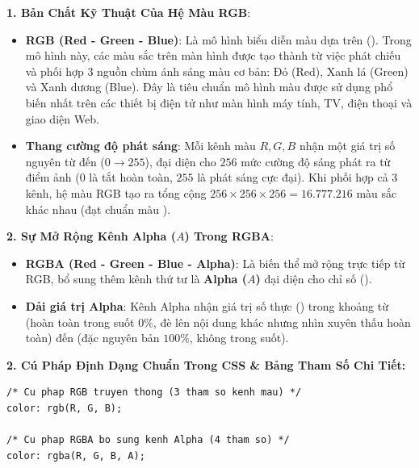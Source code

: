 \begin{conceptBox}
\textbf{1. Bản Chất Kỹ Thuật Của Hệ Màu RGB}:
\begin{itemize}[leftmargin=1.5em, itemsep=3pt, parsep=0pt]
    \item \textbf{RGB (Red - Green - Blue)}: Là mô hình biểu diễn màu dựa trên  (). Trong mô hình này, các màu sắc trên màn hình được tạo thành từ việc phát chiếu và phối hợp 3 nguồn chùm ánh sáng màu cơ bản: Đỏ (Red), Xanh lá (Green) và Xanh dương (Blue). Đây là tiêu chuẩn mô hình màu được sử dụng phổ biến nhất trên các thiết bị điện tử như màn hình máy tính, TV, điện thoại và giao diện Web.
    \item \textbf{Thang cường độ phát sáng}: Mỗi kênh màu $R, G, B$ nhận một giá trị số nguyên từ  đến  ($0 \rightarrow 255$), đại diện cho $256$ mức cường độ sáng phát ra từ điểm ảnh ($0$ là tắt hoàn toàn, $255$ là phát sáng cực đại). Khi phối hợp cả 3 kênh, hệ màu RGB tạo ra tổng cộng $256 \times 256 \times 256 = 16.777.216$ màu sắc khác nhau (đạt chuẩn màu ).
\end{itemize}

\textbf{2. Sự Mở Rộng Kênh Alpha ($A$) Trong RGBA}:
\begin{itemize}[leftmargin=1.5em, itemsep=3pt, parsep=0pt]
    \item \textbf{RGBA (Red - Green - Blue - Alpha)}: Là biến thể mở rộng trực tiếp từ RGB, bổ sung thêm kênh thứ tư là \textbf{Alpha ($A$)} đại diện cho chỉ số  ().
    \item \textbf{Dải giá trị Alpha}: Kênh Alpha nhận giá trị số thực () trong khoảng từ  (hoàn toàn trong suốt $0\%$, đè lên nội dung khác nhưng nhìn xuyên thấu hoàn toàn) đến  (đặc nguyên bản $100\%$, không trong suốt).
\end{itemize}
\end{conceptBox}

\textbf{2. Cú Pháp Định Dạng Chuẩn Trong CSS \& Bảng Tham Số Chi Tiết:}
\begin{codeWindow}
\begin{lstlisting}[language=CSS3]
/* Cu phap RGB truyen thong (3 tham so kenh mau) */
color: rgb(R, G, B);

/* Cu phap RGBA bo sung kenh Alpha (4 tham so) */
color: rgba(R, G, B, A);
\end{lstlisting}
\end{codeWindow}

